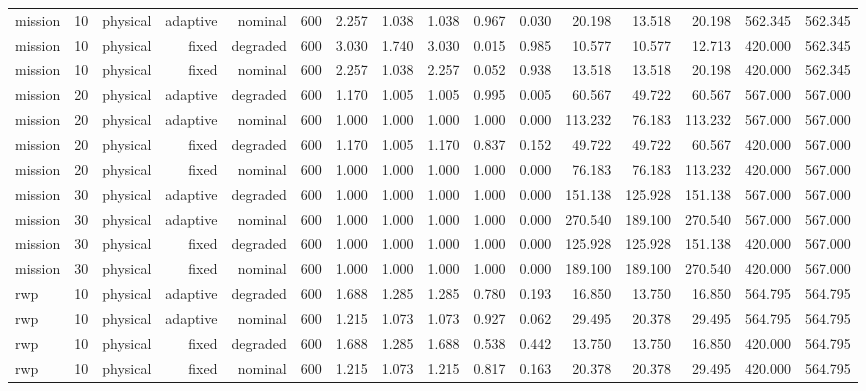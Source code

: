 \begin{tabular}{lrrrrrrrrrrrrrrr}
mission & 10 & physical & adaptive & nominal & 600 & 2.257 & 1.038 & 1.038 & 0.967 & 0.030 & 20.198 & 13.518 & 20.198 & 562.345 & 562.345 \\
mission & 10 & physical & fixed & degraded & 600 & 3.030 & 1.740 & 3.030 & 0.015 & 0.985 & 10.577 & 10.577 & 12.713 & 420.000 & 562.345 \\
mission & 10 & physical & fixed & nominal & 600 & 2.257 & 1.038 & 2.257 & 0.052 & 0.938 & 13.518 & 13.518 & 20.198 & 420.000 & 562.345 \\
mission & 20 & physical & adaptive & degraded & 600 & 1.170 & 1.005 & 1.005 & 0.995 & 0.005 & 60.567 & 49.722 & 60.567 & 567.000 & 567.000 \\
mission & 20 & physical & adaptive & nominal & 600 & 1.000 & 1.000 & 1.000 & 1.000 & 0.000 & 113.232 & 76.183 & 113.232 & 567.000 & 567.000 \\
mission & 20 & physical & fixed & degraded & 600 & 1.170 & 1.005 & 1.170 & 0.837 & 0.152 & 49.722 & 49.722 & 60.567 & 420.000 & 567.000 \\
mission & 20 & physical & fixed & nominal & 600 & 1.000 & 1.000 & 1.000 & 1.000 & 0.000 & 76.183 & 76.183 & 113.232 & 420.000 & 567.000 \\
mission & 30 & physical & adaptive & degraded & 600 & 1.000 & 1.000 & 1.000 & 1.000 & 0.000 & 151.138 & 125.928 & 151.138 & 567.000 & 567.000 \\
mission & 30 & physical & adaptive & nominal & 600 & 1.000 & 1.000 & 1.000 & 1.000 & 0.000 & 270.540 & 189.100 & 270.540 & 567.000 & 567.000 \\
mission & 30 & physical & fixed & degraded & 600 & 1.000 & 1.000 & 1.000 & 1.000 & 0.000 & 125.928 & 125.928 & 151.138 & 420.000 & 567.000 \\
mission & 30 & physical & fixed & nominal & 600 & 1.000 & 1.000 & 1.000 & 1.000 & 0.000 & 189.100 & 189.100 & 270.540 & 420.000 & 567.000 \\
rwp & 10 & physical & adaptive & degraded & 600 & 1.688 & 1.285 & 1.285 & 0.780 & 0.193 & 16.850 & 13.750 & 16.850 & 564.795 & 564.795 \\
rwp & 10 & physical & adaptive & nominal & 600 & 1.215 & 1.073 & 1.073 & 0.927 & 0.062 & 29.495 & 20.378 & 29.495 & 564.795 & 564.795 \\
rwp & 10 & physical & fixed & degraded & 600 & 1.688 & 1.285 & 1.688 & 0.538 & 0.442 & 13.750 & 13.750 & 16.850 & 420.000 & 564.795 \\
rwp & 10 & physical & fixed & nominal & 600 & 1.215 & 1.073 & 1.215 & 0.817 & 0.163 & 20.378 & 20.378 & 29.495 & 420.000 & 564.795 \\

\end{tabular}
